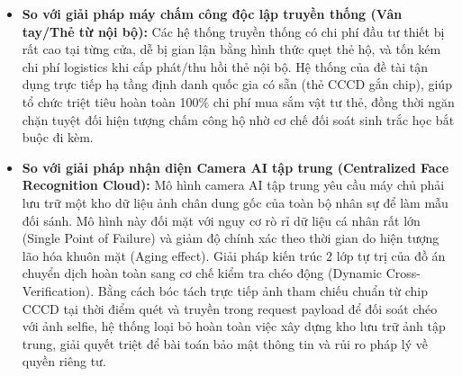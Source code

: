 \documentclass[../DoAn.tex]{subfiles}
\begin{document}
\begin{itemize}
    \item \textbf{So với giải pháp máy chấm công độc lập truyền thống (Vân tay/Thẻ từ nội bộ):} Các hệ thống truyền thống có chi phí đầu tư thiết bị rất cao tại từng cửa, dễ bị gian lận bằng hình thức quẹt thẻ hộ, và tốn kém chi phí logistics khi cấp phát/thu hồi thẻ nội bộ. Hệ thống của đề tài tận dụng trực tiếp hạ tầng định danh quốc gia có sẵn (thẻ CCCD gắn chip), giúp tổ chức triệt tiêu hoàn toàn 100\% chi phí mua sắm vật tư thẻ, đồng thời ngăn chặn tuyệt đối hiện tượng chấm công hộ nhờ cơ chế đối soát sinh trắc học bắt buộc đi kèm.
    \item \textbf{So với giải pháp nhận diện Camera AI tập trung (Centralized Face Recognition Cloud):} Mô hình camera AI tập trung yêu cầu máy chủ phải lưu trữ một kho dữ liệu ảnh chân dung gốc của toàn bộ nhân sự để làm mẫu đối sánh. Mô hình này đối mặt với nguy cơ rò rỉ dữ liệu cá nhân rất lớn (Single Point of Failure) và giảm độ chính xác theo thời gian do hiện tượng lão hóa khuôn mặt (Aging effect). Giải pháp kiến trúc 2 lớp tự trị của đồ án chuyển dịch hoàn toàn sang cơ chế kiểm tra chéo động (Dynamic Cross-Verification). Bằng cách bóc tách trực tiếp ảnh tham chiếu chuẩn từ chip CCCD tại thời điểm quét và truyền trong request payload để đối soát chéo với ảnh selfie, hệ thống loại bỏ hoàn toàn việc xây dựng kho lưu trữ ảnh tập trung, giải quyết triệt để bài toán bảo mật thông tin và rủi ro pháp lý về quyền riêng tư.
\end{itemize}
\end{document}
